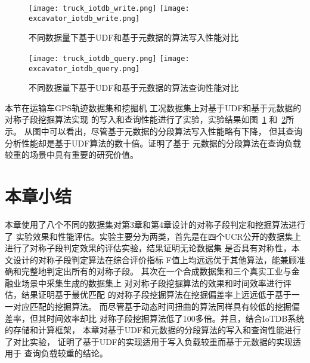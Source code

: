 \begin{figure}
  \centering
  {\texttt{[image: truck\_iotdb\_write.png]}}
  {\texttt{[image: excavator\_iotdb\_write.png]}}
  \caption{不同数据量下基于UDF和基于元数据的算法写入性能对比}
  \label{fig:iotdb_write}
\end{figure}

\begin{figure}
  \centering
  {\texttt{[image: truck\_iotdb\_query.png]}}
  {\texttt{[image: excavator\_iotdb\_query.png]}}
  \caption{不同数据量下基于UDF和基于元数据的算法查询性能对比}
  \label{fig:iotdb_query}
\end{figure}

本节在运输车GPS轨迹数据集和挖掘机
工况数据集上对基于UDF和基于元数据的对称子段挖掘算法实现
的写入和查询性能进行了实验，实验结果如图~\ref{fig:iotdb_write}
和~\ref{fig:iotdb_query}所示。
从图中可以看出，尽管基于元数据的分段算法写入性能略有下降，
但其查询分析性能却是基于UDF算法的数十倍。证明了基于
元数据的分段算法在查询负载较重的场景中具有重要的研究价值。

\section{本章小结}
本章使用了八个不同的数据集对第3章和第4章设计的对称子段判定和挖掘算法进行了
实验效果和性能评估。实验主要分为两类，首先是在四个UCR公开的数据集上
进行了对称子段判定效果的评估实验，结果证明无论数据集
是否具有对称性，本文设计的对称子段判定算法在综合评价指标
F值上均远远优于其他算法，能兼顾准确和完整地判定出所有的对称子段。
其次在一个合成数据集和三个真实工业与金融业场景中采集生成的数据集上
对对称子段挖掘算法的效果和时间效率进行评估，结果证明基于最优匹配
的对称子段挖掘算法在挖掘偏差率上远远低于基于一一对应匹配的挖掘算法。
而尽管基于动态时间扭曲的算法同样具有较低的挖掘偏差率，但其时间效率却比
对称子段挖掘算法低了100多倍。并且，结合IoTDB系统的存储和计算框架，
本章对基于UDF和元数据的分段算法的写入和查询性能进行了对比实验，
证明了基于UDF的实现适用于写入负载较重而基于元数据的实现适用于
查询负载较重的结论。

